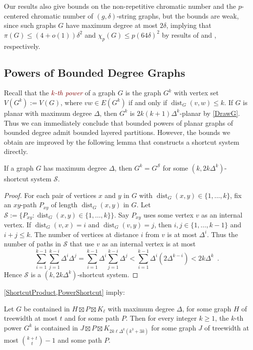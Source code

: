 \documentclass{patmorin}
\newcommand{\defin}[1]{\textcolor{Maroon}{\emph{#1}}}
\newcommand{\note}[2]{\noindent{\color{red}[#1:~#2]}}
\DeclareMathOperator{\dist}{dist}
\renewcommand{\SS}{\mathcal{S}}
\renewcommand{\le}{\leqslant}
\renewcommand{\geq}{\geqslant}
\renewcommand{\leq}{\leqslant}
\begin{document}
\note{DW}{\cref{StringPartition} has been updated.}

Our results also give bounds on the non-repetitive chromatic number and the $p$-centered chromatic number of $(g,\delta)$-string graphs, but the bounds are weak, since such graphs $G$ have maximum degree at most $2\delta$, implying that $\pi(G) \leq (4+o(1))\delta^2$ and $\chi_p(G)\le p(64\delta)^2$ by results of \citet{DJKW16} and \citet{DFMS21}, respectively.

\subsection{Powers of Bounded Degree Graphs}
\label{Powers}

Recall that the \defin{$k$-th power} of a graph $G$ is the graph $G^k$ with vertex set $V(G^k):=V(G)$, where $vw\in E(G^k)$ if and only if $\dist_G(v,w)\leq k$. If $G$ is planar with maximum degree $\Delta$, then $G^k$ is $2k(k+1)\Delta^{k}$-planar by \cref{DrawG}. Thus we can immediately conclude that bounded powers of planar graphs of bounded degree admit bounded layered partitions. However, the bounds we obtain are improved by the following lemma that constructs a shortcut system directly.

\begin{lem}
\label{PowerShortcut}
If a graph $G$ has maximum degree $\Delta$, then $G^k = G^\SS$ for some $(k,2k \Delta^{k})$-shortcut system $\SS$.
\end{lem}

\begin{proof}
For each pair of vertices $x$ and $y$ in $G$ with $\dist_G(x,y)\in\{1,\dots,k\}$, fix an $xy$-path $P_{xy}$ of length
$\dist_G(x,y)$  in $G$. Let $\SS:=\{P_{xy}: \dist_G(x,y)\in\{1,\dots,k\} \}$. Say $P_{xy}$ uses some vertex $v$ as an internal vertex. If $\dist_G(v,x)=i$ and $\dist_G(v,y)=j$, then $i,j\in\{1,\dots,k-1\}$ and $i+j\leq k$. The number of vertices at distance $i$ from $v$ is at most $\Delta^i$. Thus the number of paths in $\SS$ that use $v$ as an internal vertex is at most
\[\sum_{i=1}^{k-1} \sum_{j=1}^{k-i} \Delta^i\Delta^j
= \sum_{i=1}^{k-1} \Delta^i \sum_{j=1}^{k-i} \Delta^j
< \sum_{i=1}^{k-1} \Delta^i ( 2 \Delta^{k-i} )
< 2k \Delta^k\enspace.\]
Hence $\SS$ is a $(k, 2k \Delta^k)$-shortcut system.
\end{proof}

\cref{ShortcutProduct,PowerShortcut} imply:

\begin{thm}
\label{PowerProduct}
Let $G$ be contained in $H\boxtimes P\boxtimes K_\ell$ with maximum degree $\Delta$, for some graph $H$ of treewidth at most $t$ and for some path $P$. Then for every integer $k\geq 1$, the $k$-th power $G^k$ is contained in $J\boxtimes P\boxtimes K_{2k \ell \Delta^{k}(k^3+3k)}$ for some graph $J$ of treewidth at most $\binom{k+t}{t}-1$ and some path $P$.
\end{thm}
\end{document}
